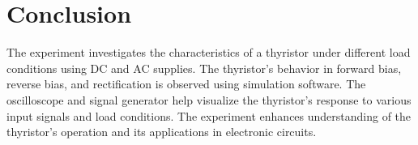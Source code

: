 \documentclass[12pt]{article}
\begin{document}
\section*{Conclusion}
The experiment investigates the characteristics of a thyristor under different load conditions using DC and AC supplies. The thyristor's behavior in forward bias, reverse bias, and rectification is observed using simulation software. The oscilloscope and signal generator help visualize the thyristor's response to various input signals and load conditions. The experiment enhances understanding of the thyristor's operation and its applications in electronic circuits.


\renewcommand{\bibname}{References}

\end{document}
